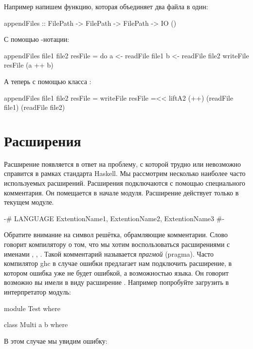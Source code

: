 Например напишем функцию, которая объединяет два файла в один:


\begin{code}
appendFiles :: FilePath -> FilePath -> FilePath -> IO ()
\end{code}

С помощью -нотации:


\begin{code}
appendFiles file1 file2 resFile = do
	a <- readFile file1
	b <- readFile file2
	writeFile resFile (a ++ b)	
\end{code}

А теперь с помощью класса :


\begin{code}
appendFiles file1 file2 resFile = writeFile resFile =<< 
	liftA2 (++) (readFile file1) (readFile file2)
\end{code}

\section{Расширения}

Расширение появляется в ответ на проблему, с которой трудно или
невозможно справится в рамках стандарта Haskell. Мы рассмотрим несколько
наиболее часто используемых расширений. Расширения подключаются с
помощью специального комментария. Он помещается в начале модуля.
Расширение действует только в текущем модуле.


\begin{code}
{-# LANGUAGE  ExtentionName1, ExtentionName2, ExtentionName3 #-}
\end{code}

Обратите внимание на символ решётка, обрамляющие комментарии. Слово
 говорит компилятору о том, что мы хотим воспользоваться
расширениями с именами , ,
. Такой комментарий называется \emph{прагмой}
(pragma). Часто компилятор ghc в случае ошибки предлагает нам подключить
расширение, в котором ошибка уже не будет ошибкой, а возможностью языка.
Он говорит возможно вы имели в виду расширение . Например
попробуйте загрузить в интерпретатор модуль:


\begin{code}
module Test where

class Multi a b where
\end{code}

В этом случае мы увидим ошибку:


